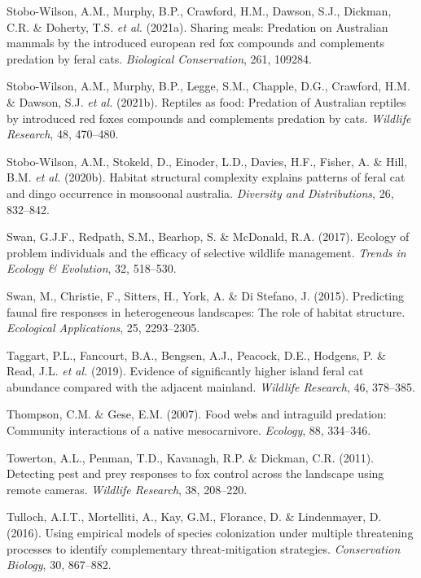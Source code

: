 \documentclass[11pt,a4paper,titlepage,twoside,openright]{style/unimelbthesis}
\begin{document}
\begin{mainmatter}
\leavevmode\hypertarget{ref-stobo2021sharing}{}%
Stobo-Wilson, A.M., Murphy, B.P., Crawford, H.M., Dawson, S.J., Dickman, C.R. \& Doherty, T.S. \emph{et al.} (2021a). Sharing meals: Predation on Australian mammals by the introduced european red fox compounds and complements predation by feral cats. \emph{Biological Conservation}, 261, 109284.

\leavevmode\hypertarget{ref-stobo2021reptiles}{}%
Stobo-Wilson, A.M., Murphy, B.P., Legge, S.M., Chapple, D.G., Crawford, H.M. \& Dawson, S.J. \emph{et al.} (2021b). Reptiles as food: Predation of Australian reptiles by introduced red foxes compounds and complements predation by cats. \emph{Wildlife Research}, 48, 470--480.

\leavevmode\hypertarget{ref-stobo2020habitat}{}%
Stobo-Wilson, A.M., Stokeld, D., Einoder, L.D., Davies, H.F., Fisher, A. \& Hill, B.M. \emph{et al.} (2020b). Habitat structural complexity explains patterns of feral cat and dingo occurrence in monsoonal australia. \emph{Diversity and Distributions}, 26, 832--842.

\leavevmode\hypertarget{ref-swan2017ecology}{}%
Swan, G.J.F., Redpath, S.M., Bearhop, S. \& McDonald, R.A. (2017). Ecology of problem individuals and the efficacy of selective wildlife management. \emph{Trends in Ecology \& Evolution}, 32, 518--530.

\leavevmode\hypertarget{ref-swan2015predicting}{}%
Swan, M., Christie, F., Sitters, H., York, A. \& Di Stefano, J. (2015). Predicting faunal fire responses in heterogeneous landscapes: The role of habitat structure. \emph{Ecological Applications}, 25, 2293--2305.

\leavevmode\hypertarget{ref-taggart2019evidence}{}%
Taggart, P.L., Fancourt, B.A., Bengsen, A.J., Peacock, D.E., Hodgens, P. \& Read, J.L. \emph{et al.} (2019). Evidence of significantly higher island feral cat abundance compared with the adjacent mainland. \emph{Wildlife Research}, 46, 378--385.

\leavevmode\hypertarget{ref-thompson2007food}{}%
Thompson, C.M. \& Gese, E.M. (2007). Food webs and intraguild predation: Community interactions of a native mesocarnivore. \emph{Ecology}, 88, 334--346.

\leavevmode\hypertarget{ref-towerton2011detecting}{}%
Towerton, A.L., Penman, T.D., Kavanagh, R.P. \& Dickman, C.R. (2011). Detecting pest and prey responses to fox control across the landscape using remote cameras. \emph{Wildlife Research}, 38, 208--220.

\leavevmode\hypertarget{ref-tulloch2016using}{}%
Tulloch, A.I.T., Mortelliti, A., Kay, G.M., Florance, D. \& Lindenmayer, D. (2016). Using empirical models of species colonization under multiple threatening processes to identify complementary threat-mitigation strategies. \emph{Conservation Biology}, 30, 867--882.


\end{mainmatter}
\end{document}
